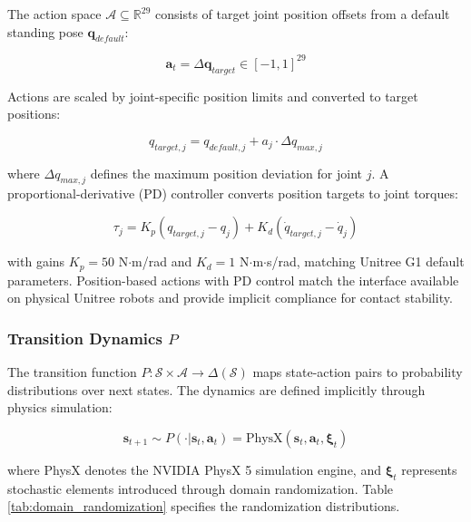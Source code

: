 \documentclass[12pt,a4paper]{article}
\begin{document}
The action space $\mathcal{A} \subseteq \mathbb{R}^{29}$ consists of target joint position offsets from a default standing pose $\mathbf{q}_{default}$:

\begin{equation}
\mathbf{a}_t = \Delta\mathbf{q}_{target} \in [-1, 1]^{29}
\label{eq:action_space}
\end{equation}

Actions are scaled by joint-specific position limits and converted to target positions:

\begin{equation}
q_{target,j} = q_{default,j} + a_j \cdot \Delta q_{max,j}
\end{equation}

where $\Delta q_{max,j}$ defines the maximum position deviation for joint $j$. A proportional-derivative (PD) controller converts position targets to joint torques:

\begin{equation}
\tau_j = K_p (q_{target,j} - q_j) + K_d (\dot{q}_{target,j} - \dot{q}_j)
\label{eq:pd_control}
\end{equation}

with gains $K_p = 50$ N$\cdot$m/rad and $K_d = 1$ N$\cdot$m$\cdot$s/rad, matching Unitree G1 default parameters. Position-based actions with PD control match the interface available on physical Unitree robots and provide implicit compliance for contact stability.

\subsubsection{Transition Dynamics $P$}

The transition function $P: \mathcal{S} \times \mathcal{A} \rightarrow \Delta(\mathcal{S})$ maps state-action pairs to probability distributions over next states. The dynamics are defined implicitly through physics simulation:

\begin{equation}
\mathbf{s}_{t+1} \sim P(\cdot | \mathbf{s}_t, \mathbf{a}_t) = \text{PhysX}(\mathbf{s}_t, \mathbf{a}_t, \boldsymbol{\xi}_t)
\label{eq:transition}
\end{equation}

where PhysX denotes the NVIDIA PhysX 5 simulation engine, and $\boldsymbol{\xi}_t$ represents stochastic elements introduced through domain randomization. Table \ref{tab:domain_randomization} specifies the randomization distributions.
\end{document}
